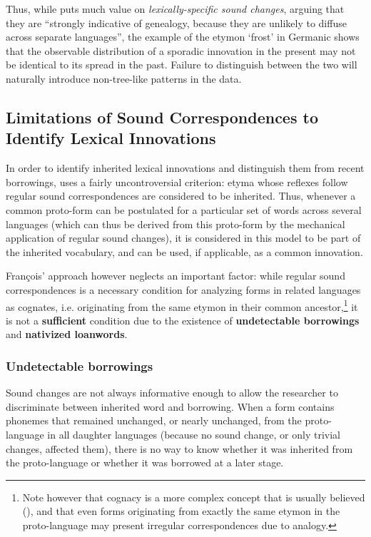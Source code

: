 \documentclass[oneside,a4paper,11pt]{article}
\begin{document}
Thus, while \citet[178]{francois15tree} puts much value on \textit{lexically-specific sound changes}, arguing that they are ``strongly indicative of genealogy, because they are unlikely to diffuse across separate languages'', the example of the etymon `frost' in Germanic shows that the observable distribution of a sporadic innovation in the present may not be identical to its spread in the past. Failure to distinguish between the two will naturally introduce non-tree-like patterns in the data.


\subsection{Limitations of Sound Correspondences to Identify Lexical Innovations}
In order to identify inherited lexical innovations and distinguish them from recent borrowings, \citet[176-8]{francois15tree} uses a fairly uncontroversial criterion: etyma whose reflexes follow regular sound correspondences are considered to be inherited. Thus, whenever a common proto-form can be postulated for a particular set of words across several languages (which can thus be derived from this proto-form by the mechanical application of regular sound changes), it is considered in this model to be part of the inherited vocabulary, and can be used, if applicable, as a common innovation.

François' approach however neglects an important factor: while regular sound correspondences is a necessary condition for analyzing forms in related languages as cognates, i.e. originating from the same etymon in their common ancestor,\footnote{Note however that cognacy is a more complex concept that is usually believed (\citealt{list16cognacy}), and that even forms originating from exactly the same etymon in the proto-language may present irregular correspondences due to analogy. } it is not a \textbf{sufficient} condition due to the existence of \textbf{undetectable borrowings} and \textbf{nativized loanwords}.  


\subsubsection{Undetectable borrowings}
Sound changes are not always informative enough to allow the researcher to discriminate between inherited word and borrowing. When a form contains phonemes that remained unchanged, or nearly unchanged, from the proto-language in all daughter languages (because no sound change, or only trivial changes, affected them), there is no way to know whether it was inherited from the proto-language or whether it was borrowed at a later stage. 
\end{document}
